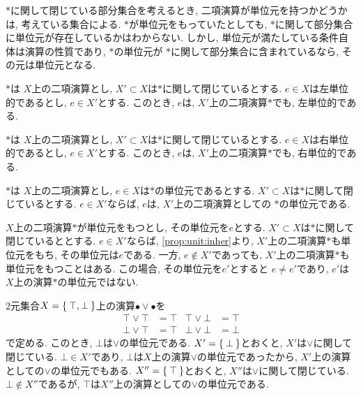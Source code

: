 $\ast$に関して閉じている部分集合を考えるとき,
二項演算が単位元を持つかどうかは,
考えている集合による.
$\ast$が単位元をもっていたとしても,
$\ast$に関して部分集合に単位元が存在しているかはわからない.
しかし,
単位元が満たしている条件自体は演算の性質であり,
$\ast$の単位元が
$\ast$に関して部分集合に含まれているなら,
その元は単位元となる.
\begin{prop}
  $\ast$は
  $X$上の二項演算とし,
  $X'\subset X$は$\ast$に関して閉じているとする.
  $e\in X$は左単位的であるとし,
  $e\in X'$とする.
  このとき,
  $e$は,
  $X'$上の二項演算$\ast$でも,
  左単位的である.
\end{prop}
\begin{prop}
  $\ast$は
  $X$上の二項演算とし,
  $X'\subset X$は$\ast$に関して閉じているとする.
  $e\in X$は右単位的であるとし,
  $e\in X'$とする.
  このとき,
  $e$は,
  $X'$上の二項演算$\ast$でも,
  右単位的である.
\end{prop}
\begin{prop}
  \label{prop:unit:inher}
  $\ast$は
  $X$上の二項演算とし,
  $e\in X$は$\ast$の単位元であるとする.
  $X'\subset X$は$\ast$に関して閉じているとする.
  $e\in X'$ならば,
  $e$は,
  $X'$上の二項演算としての
  $\ast$の単位元である.
\end{prop}
\begin{remark}
  $X$上の二項演算$\ast$が単位元をもつとし,
  その単位元を$e$とする.
  $X'\subset X$は$\ast$に関して閉じているととする.
  $e\in X'$ならば,
  \cref{prop:unit:inher}より,
  $X'$上の二項演算$\ast$も単位元をもち,
  その単位元は$e$である.
  一方, $e\not\in X'$であっても,
  $X'$上の二項演算$\ast$も単位元をもつことはある.
  この場合,
  その単位元を$e'$とすると
  $e\neq e'$であり, $e'$は$X$上の演算$\ast$の単位元ではない.
\end{remark}
\begin{example}
  $2$元集合$X=\Set{\top, \bot}$上の演算$\bullet\lor\bullet$を
  \begin{align*}
   {\top \lor \top} &= \top&
   {\top \lor \bot} &= \top\\
   {\bot \lor \top} &= \top&
   {\bot \lor \bot} &= \bot    
  \end{align*}
  で定める.
  このとき, $\bot$は$\lor$の単位元である.
  $X'=\Set{\bot}$とおくと, $X'$は$\lor$に関して閉じている.
  $\bot \in X'$であり, $\bot$は$X$上の演算$\lor$の単位元であったから,
  $X'$上の演算としての$\lor$の単位元でもある.
  $X''=\Set{\top}$とおくと, $X''$は$\lor$に関して閉じている.
  $\bot\not\in X''$であるが,
  $\top$は$X''$上の演算としての$\lor$の単位元である.
\end{example}


